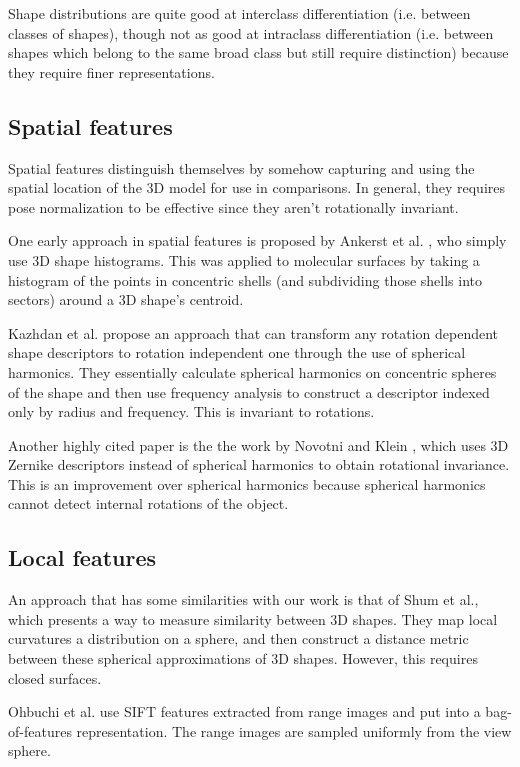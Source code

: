 \documentclass[../tech_report_1.tex]{subfiles}
\begin{document}
Shape distributions are quite good at interclass differentiation (i.e. between classes of shapes), though not as good at intraclass differentiation \cite{tangelder2008survey} (i.e. between shapes which belong to the same broad class but still require distinction) because they require finer representations.

\subsection{Spatial features}

Spatial features distinguish themselves by somehow capturing and using the spatial location of the 3D model for use in comparisons. In general, they requires pose normalization to be effective since they aren't rotationally invariant.

One early approach in spatial features is proposed by Ankerst et al. \cite{ankerst19993d}, who simply use 3D shape histograms. This was applied to molecular surfaces by taking a histogram of the points in concentric shells (and subdividing those shells into sectors) around a 3D shape's centroid.

Kazhdan et al. \cite{kazhdan2003rotation} propose an approach that can transform any rotation dependent shape descriptors to rotation independent one through the use of spherical harmonics. They essentially calculate spherical harmonics on concentric spheres of the shape and then use frequency analysis to construct a descriptor indexed only by radius and frequency. This is invariant to rotations.

Another highly cited paper is the the work by Novotni and Klein \cite{novotni20033d}, which uses 3D Zernike descriptors instead of spherical harmonics to obtain rotational invariance. This is an improvement over spherical harmonics because spherical harmonics cannot detect internal rotations of the object.

\subsection{Local features}

An approach that has some similarities with our work is that of Shum et al., which presents a way to measure similarity between 3D shapes. They map local curvatures a distribution on a sphere, and then construct a distance metric between these spherical approximations of 3D shapes. However, this requires closed surfaces.

Ohbuchi et al. \cite{ohbuchi2008salient} use SIFT features extracted from range images and put into a bag-of-features representation. The range images are sampled uniformly from the view sphere.
\end{document}
